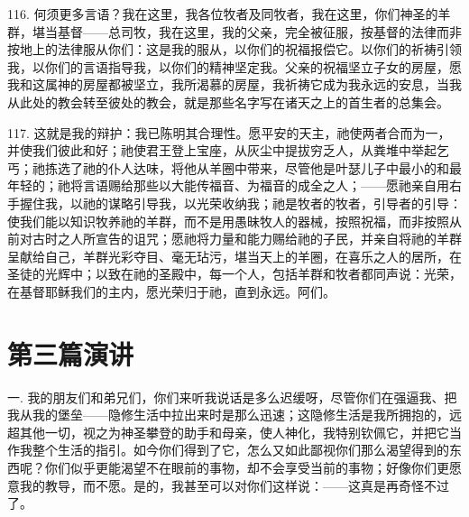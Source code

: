116. 何须更多言语？我在这里，我各位牧者及同牧者，我在这里，你们神圣的羊群，堪当基督——总司牧，我在这里，我的父亲，完全被征服，按基督的法律而非按地上的法律服从你们：这是我的服从，以你们的祝福报偿它。以你们的祈祷引领我，以你们的言语指导我，以你们的精神坚定我。父亲的祝福坚立子女的房屋，愿我和这属神的房屋都被坚立，我所渴慕的房屋，我祈祷它成为我永远的安息，当我从此处的教会转至彼处的教会，就是那些名字写在诸天之上的首生者的总集会。\par

117. 这就是我的辩护：我已陈明其合理性。愿平安的天主，祂使两者合而为一，并使我们彼此和好；祂使君王登上宝座，从灰尘中提拔穷乏人，从粪堆中举起乞丐；祂拣选了祂的仆人达味，将他从羊圈中带来，尽管他是叶瑟儿子中最小的和最年轻的；祂将言语赐给那些以大能传福音、为福音的成全之人；——愿祂亲自用右手握住我，以祂的谋略引导我，以光荣收纳我；祂是牧者的牧者，引导者的引导：使我们能以知识牧养祂的羊群，而不是用愚昧牧人的器械，按照祝福，而非按照从前对古时之人所宣告的诅咒；愿祂将力量和能力赐给祂的子民，并亲自将祂的羊群呈献给自己，羊群光彩夺目、毫无玷污，堪当天上的羊圈，在喜乐之人的居所，在圣徒的光辉中；以致在祂的圣殿中，每一个人，包括羊群和牧者都同声说：光荣，在基督耶稣我们的主内，愿光荣归于祂，直到永远。阿们。\par



\section{第三篇演讲}

\par

\par

一. 我的朋友们和弟兄们，你们来听我说话是多么迟缓呀，尽管你们在强逼我、把我从我的堡垒——隐修生活中拉出来时是那么迅速；这隐修生活是我所拥抱的，远超其他一切，视之为神圣攀登的助手和母亲，使人神化，我特别钦佩它，并把它当作我整个生活的指引。如今你们得到了它，怎么又如此鄙视你们那么渴望得到的东西呢？你们似乎更能渴望不在眼前的事物，却不会享受当前的事物；好像你们更愿意我的教导，而不愿。是的，我甚至可以对你们这样说：——这真是再奇怪不过了。\par

